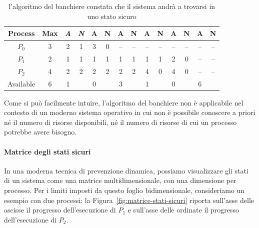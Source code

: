 \documentclass[12pt,a4paper]{article}
\begin{document}
\begin{table}[H]
\centering
\begin{tabular}{c | c | c c | c c | c c | c c | c c | c c}
  Process   & \textbf{Max}  & \emph{A}  & \emph{N}  & A & N & A   & N   & A   & N   & A   & N   & A   & N   \\ \hline
  $P_0$     & 3             & 2         & 1         & 3 & 0 & --  & --  & --  & --  & --  & --  & --  & --  \\
  $P_1$     & 2             & 1         & 1         & 1 & 1 & 1   & 1   & 1   & 1   & 2   & 0   & --  & --  \\
  $P_2$     & 4             & 2         & 2         & 2 & 2 & 2   & 2   & 4   & 0   & 4   & 0   & --  & --  \\ \hline
  Available & 6             & 1         &           & 0 &   & 3   &     & 1   &     & 0   &     & 6   &     \\
\end{tabular}
\caption{l'algoritmo del banchiere constata che il sistema andrà a trovarsi in uno stato sicuro}
\end{table}

Come si può facilmente intuire, l'algoritmo del banchiere non è applicabile
nel contesto di un moderno sistema operativo in cui non è possibile conoscere
a priori né il numero di risorse disponibili, né il numero di risorse di
cui un processo potrebbe avere bisogno.

\paragraph{Matrice degli stati sicuri}
In una moderna tecnica di prevenzione dinamica, possiamo visualizzare
gli stati di un sistema come una matrice multidimensionale, con una
dimensione per processo.
Per i limiti imposti da questo foglio bidimensionale, consideriamo un
esempio con due processi: la Figura~\ref{fig:matrice-stati-sicuri}
riporta sull'asse delle ascisse il progresso dell'esecuzione di $P_1$ e
sull'asse delle ordinate il progresso dell'esecuzione di $P_2$.
\end{document}
